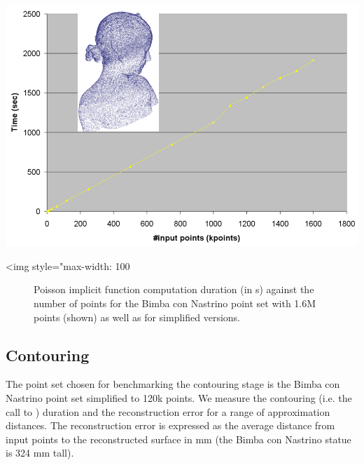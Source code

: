 \begin{center}
    \begin{ccTexOnly}
        \includegraphics[width=1.0\textwidth]{Surface_reconstruction_points_3/poisson_bench}
    \end{ccTexOnly}
    \begin{ccHtmlOnly}
        <img style="max-width: 100%
    \end{ccHtmlOnly}
    \begin{figure}[h]
        \caption{Poisson implicit function computation duration (in s)
                 against the number of points  for the Bimba con Nastrino
                 point set with 1.6M points (shown)
                 as well as for simplified versions.}
        \label{Surface_reconstruction_points_3-fig-poisson_bench}
    \end{figure}
\end{center}



\subsection{Contouring}

The point set chosen for benchmarking the contouring stage is the Bimba con Nastrino point set simplified to 120k points. We measure the contouring (i.e. the call to ) duration and the reconstruction error for a range of approximation distances.
The reconstruction error is expressed as the average distance from input points to the reconstructed surface in mm (the Bimba con Nastrino statue is 324 mm tall).

